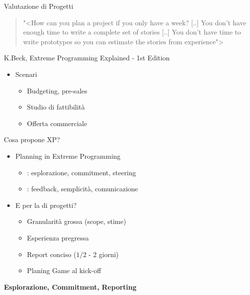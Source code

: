 	\begin{frame}{Valutazione di Progetti}
		\begin{quote}
			{\small "<{How can you plan a project if you only have a week? [..] You don't have enough time to write a complete set of stories [..] You don't have time to write prototypes so you can estimate the stories from experience}">}
		\end{quote}
		\hfill {\scriptsize K.Beck, Extreme Programming Explained - 1st Edition}

		\begin{itemize}
			\item Scenari
			\begin{itemize}
				\item Budgeting, pre-sales
				\item Studio di fattibilità
				\item Offerta commerciale
			\end{itemize}
		\end{itemize}
		
	\end{frame}


	\begin{frame}{Cosa propone XP?}
		\begin{itemize}
			\item Planning in Extreme Programming
			\begin{itemize}
				\item {}: esplorazione, commitment, steering
				\item {}: feedback, semplicità, comunicazione
			\end{itemize}
		\end{itemize}

		\begin{itemize}
			\item E per la  di progetti?
			\begin{itemize}
				\item Granularità grossa (scope, stime)
				\item Esperienza pregressa
				\item Report conciso ($1/2$ - 2 giorni)
				\item Planing Game al kick-off
			\end{itemize}
		\end{itemize}
		
		\begin{center}
			\textbf{Esplorazione, Commitment, Reporting}
		\end{center}
	\end{frame}


